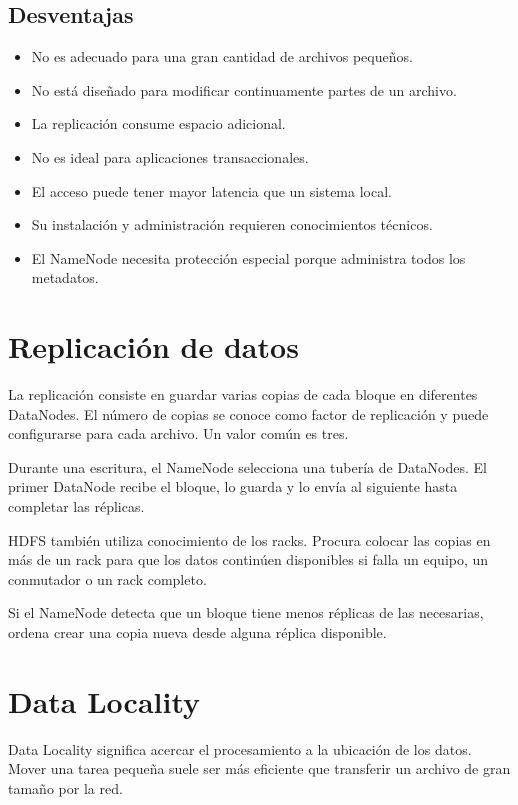 \subsection{Desventajas}

\begin{itemize}
    \item No es adecuado para una gran cantidad de archivos pequeños.
    \item No está diseñado para modificar continuamente partes de un archivo.
    \item La replicación consume espacio adicional.
    \item No es ideal para aplicaciones transaccionales.
    \item El acceso puede tener mayor latencia que un sistema local.
    \item Su instalación y administración requieren conocimientos técnicos.
    \item El NameNode necesita protección especial porque administra todos los
    metadatos.
\end{itemize}

\section{Replicación de datos}

La replicación consiste en guardar varias copias de cada bloque en diferentes
DataNodes. El número de copias se conoce como factor de replicación y puede
configurarse para cada archivo. Un valor común es tres.

Durante una escritura, el NameNode selecciona una tubería de DataNodes. El
primer DataNode recibe el bloque, lo guarda y lo envía al siguiente hasta
completar las réplicas.

HDFS también utiliza conocimiento de los racks. Procura colocar las copias en
más de un rack para que los datos continúen disponibles si falla un equipo,
un conmutador o un rack completo.

Si el NameNode detecta que un bloque tiene menos réplicas de las necesarias,
ordena crear una copia nueva desde alguna réplica disponible.

\section{Data Locality}

Data Locality significa acercar el procesamiento a la ubicación de los datos.
Mover una tarea pequeña suele ser más eficiente que transferir un archivo de
gran tamaño por la red.

